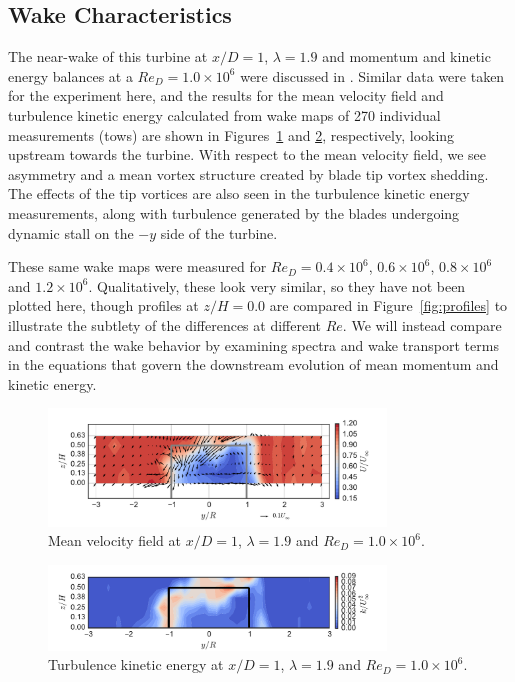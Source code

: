 \documentclass[energies,article,accept,moreauthors,pdftex,10pt,a4paper]{mdpi}
\theoremstyle{mdpi}
\newcounter{ex}
\newcounter{re}
\begin{document}
\subsection{Wake Characteristics}

The near-wake of this turbine at $x/D=1$, $\lambda=1.9$ and momentum and
kinetic energy balances at a $Re_D = 1.0 \times 10^6$ were discussed in
\cite{Bachant2015-JoT}. Similar data were taken for the experiment here, and the
results for the mean velocity field and turbulence kinetic energy calculated
from wake maps of 270 individual measurements (tows) are shown in
Figures~\ref{fig:meancontquiv} and \ref{fig:kcont}, respectively, looking
upstream towards the turbine. With respect to the mean velocity field, we see
asymmetry and a mean vortex structure created by blade tip vortex shedding. The
effects of the tip vortices are also seen in the turbulence kinetic energy
measurements, along with turbulence generated by the blades undergoing dynamic
stall on the $-y$ side of the turbine.

These same wake maps were measured for $Re_D = 0.4 \times 10^6$, $0.6 \times
10^6$, $0.8 \times 10^6$ and $1.2 \times 10^6$. Qualitatively, these look very
similar, so they have not been plotted here, though profiles at $z/H=0.0$ are
compared in Figure~\ref{fig:profiles} to illustrate the subtlety of the
differences at different $Re$. We will instead compare and contrast the wake
behavior by examining spectra and wake transport terms in the equations that
govern the downstream evolution of mean momentum and kinetic energy.

\begin{figure}[H]
 \centering
 
 \includegraphics[width=0.8\textwidth]{figures/meancontquiv_10}
 
 \caption{Mean velocity field at $x/D=1$, $\lambda=1.9$ and $Re_D=1.0 \times
 10^6$.}
 
 \label{fig:meancontquiv}
\end{figure}
\unskip

\begin{figure}[H]
 \centering
 
 \includegraphics[width=0.8\textwidth]{figures/k_contours_10}
 
 \caption{Turbulence kinetic energy at $x/D=1$, $\lambda=1.9$ and $Re_D=1.0
 \times 10^6$.}
 
 \label{fig:kcont}
\end{figure}
\unskip
\end{document}
